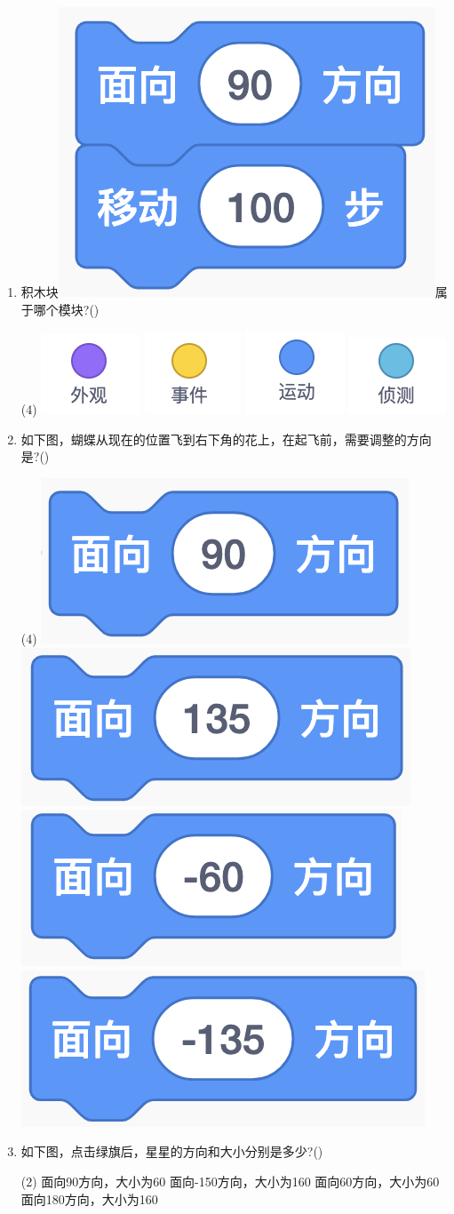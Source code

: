 \documentclass[10pt, a4paper]{article}
\begin{document}
\begin{enumerate}
        \item 积木块\includegraphics[width=.08\textwidth]{12.png}属于哪个模块?(\qquad)
        \begin{tasks}(4)
            \task \includegraphics[width=.06\textwidth]{12a.png}
            \task \includegraphics[width=.06\textwidth]{12b.png}
            \task \includegraphics[width=.06\textwidth]{12c.png}
            \task \includegraphics[width=.06\textwidth]{12d.png}
        \end{tasks}

        \item 如下图，蝴蝶从现在的位置飞到右下角的花上，在起飞前，需要调整的方向是?(\qquad)
        \begin{tasks}(4)
            \task \includegraphics[width=.1\textwidth]{13a.png}
            \task \includegraphics[width=.1\textwidth]{13b.png}
            \task \includegraphics[width=.1\textwidth]{13c.png}
            \task \includegraphics[width=.1\textwidth]{13d.png}
        \end{tasks}

        \item 如下图，点击绿旗后，星星的方向和大小分别是多少?(\qquad)
        \begin{tasks}(2)
            \task 面向90方向，大小为60
            \task 面向-150方向，大小为160
            \task 面向60方向，大小为60
            \task 面向180方向，大小为160
        \end{tasks}


\end{enumerate}
\end{document}
